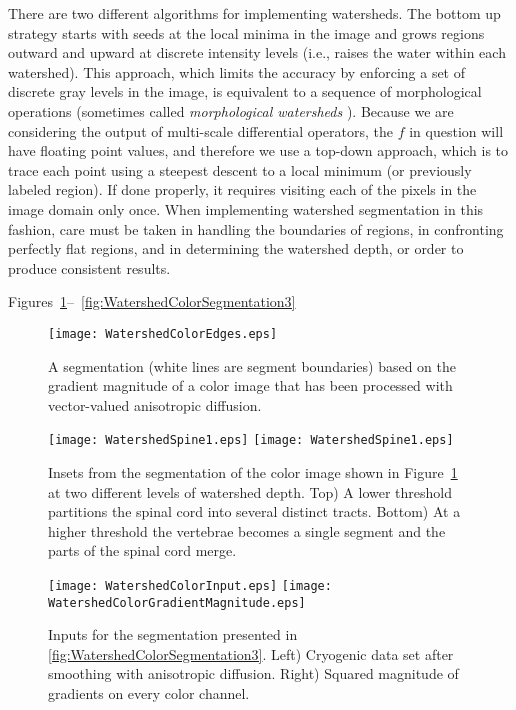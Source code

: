 There are two different algorithms for implementing watersheds.  The bottom up
strategy starts with seeds at the local minima in the image and grows regions
outward and upward at discrete intensity levels (i.e., raises the water within
each watershed).  This approach, which limits the accuracy by enforcing a set
of discrete gray levels in the image, is equivalent to a sequence of
morphological operations (sometimes called {\em morphological watersheds}
\cite{Serra1982}).  Because we are considering the output of multi-scale
differential operators, the $f$ in question will have floating point values,
and therefore we use a top-down approach, which is to trace each point using a
steepest descent to a local minimum (or previously labeled region).  If done
properly, it requires visiting each of the pixels in the image domain only
once.  When implementing watershed segmentation in this fashion, care must be
taken in handling the boundaries of regions, in confronting perfectly flat
regions, and in determining the watershed depth, or order to produce consistent
results.

Figures~\ref{fig:WatershedColorSegmentation1}--~\ref{fig:WatershedColorSegmentation3}
\begin{figure}
\centering
\texttt{[image: WatershedColorEdges.eps]}
\caption{
A segmentation (white lines are segment boundaries) based on 
the gradient magnitude of a color image that has been processed with 
vector-valued anisotropic diffusion.}
\protect\label{fig:WatershedColorSegmentation1}
\end{figure}
\begin{figure}
\centering
\texttt{[image: WatershedSpine1.eps]}
\texttt{[image: WatershedSpine1.eps]}
\caption{
Insets from the segmentation of the color image shown in 
Figure~\protect\ref{fig:WatershedColorSegmentation1} at two different levels of 
watershed depth.  Top) A lower threshold partitions the spinal cord
into several distinct tracts.  Bottom) At a higher threshold the 
vertebrae becomes a single segment and the parts of the 
spinal cord merge.
}
\protect\label{fig:WatershedColorSegmentation2}
\end{figure}

\begin{figure}
\centering
\texttt{[image: WatershedColorInput.eps]}
\texttt{[image: WatershedColorGradientMagnitude.eps]}
\caption{
Inputs for the segmentation presented in \ref{fig:WatershedColorSegmentation3}.
Left) Cryogenic data set after smoothing with anisotropic diffusion.  Right)
Squared magnitude of gradients on every color channel.}
\protect\label{fig:WatershedColorInput}
\end{figure}


